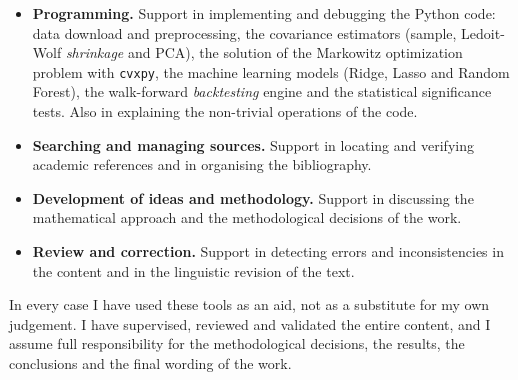 {{        \begin{itemize}
            \item \textbf{Programming.} Support in implementing and debugging the Python code: data download and preprocessing, the covariance estimators (sample, Ledoit-Wolf \textit{shrinkage} and PCA), the solution of the Markowitz optimization problem with \texttt{cvxpy}, the machine learning models (Ridge, Lasso and Random Forest), the walk-forward \textit{backtesting} engine and the statistical significance tests. Also in explaining the non-trivial operations of the code.
            \item \textbf{Searching and managing sources.} Support in locating and verifying academic references and in organising the bibliography.
            \item \textbf{Development of ideas and methodology.} Support in discussing the mathematical approach and the methodological decisions of the work.
            \item \textbf{Review and correction.} Support in detecting errors and inconsistencies in the content and in the linguistic revision of the text.
        \end{itemize}

        In every case I have used these tools as an aid, not as a substitute for my own judgement. I have supervised, reviewed and validated the entire content, and I assume full responsibility for the methodological decisions, the results, the conclusions and the final wording of the work.
    }

    \MediaOptionLogicBlank
}{}

